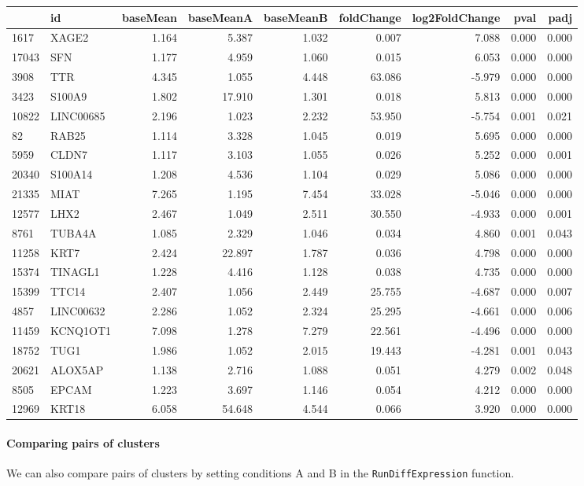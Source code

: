 \documentclass[]{article}
\let\oldparagraph\paragraph
\renewcommand{\paragraph}[1]{\oldparagraph{#1}\mbox{}}
\begin{document}
\begin{longtable}[]{@{}llrrrrrrr@{}}
\toprule
& id & baseMean & baseMeanA & baseMeanB & foldChange & log2FoldChange &
pval & padj\tabularnewline
\midrule
\endhead
1617 & XAGE2 & 1.164 & 5.387 & 1.032 & 0.007 & 7.088 & 0.000 &
0.000\tabularnewline
17043 & SFN & 1.177 & 4.959 & 1.060 & 0.015 & 6.053 & 0.000 &
0.000\tabularnewline
3908 & TTR & 4.345 & 1.055 & 4.448 & 63.086 & -5.979 & 0.000 &
0.000\tabularnewline
3423 & S100A9 & 1.802 & 17.910 & 1.301 & 0.018 & 5.813 & 0.000 &
0.000\tabularnewline
10822 & LINC00685 & 2.196 & 1.023 & 2.232 & 53.950 & -5.754 & 0.001 &
0.021\tabularnewline
82 & RAB25 & 1.114 & 3.328 & 1.045 & 0.019 & 5.695 & 0.000 &
0.000\tabularnewline
5959 & CLDN7 & 1.117 & 3.103 & 1.055 & 0.026 & 5.252 & 0.000 &
0.001\tabularnewline
20340 & S100A14 & 1.208 & 4.536 & 1.104 & 0.029 & 5.086 & 0.000 &
0.000\tabularnewline
21335 & MIAT & 7.265 & 1.195 & 7.454 & 33.028 & -5.046 & 0.000 &
0.000\tabularnewline
12577 & LHX2 & 2.467 & 1.049 & 2.511 & 30.550 & -4.933 & 0.000 &
0.001\tabularnewline
8761 & TUBA4A & 1.085 & 2.329 & 1.046 & 0.034 & 4.860 & 0.001 &
0.043\tabularnewline
11258 & KRT7 & 2.424 & 22.897 & 1.787 & 0.036 & 4.798 & 0.000 &
0.000\tabularnewline
15374 & TINAGL1 & 1.228 & 4.416 & 1.128 & 0.038 & 4.735 & 0.000 &
0.000\tabularnewline
15399 & TTC14 & 2.407 & 1.056 & 2.449 & 25.755 & -4.687 & 0.000 &
0.007\tabularnewline
4857 & LINC00632 & 2.286 & 1.052 & 2.324 & 25.295 & -4.661 & 0.000 &
0.006\tabularnewline
11459 & KCNQ1OT1 & 7.098 & 1.278 & 7.279 & 22.561 & -4.496 & 0.000 &
0.000\tabularnewline
18752 & TUG1 & 1.986 & 1.052 & 2.015 & 19.443 & -4.281 & 0.001 &
0.043\tabularnewline
20621 & ALOX5AP & 1.138 & 2.716 & 1.088 & 0.051 & 4.279 & 0.002 &
0.048\tabularnewline
8505 & EPCAM & 1.223 & 3.697 & 1.146 & 0.054 & 4.212 & 0.000 &
0.000\tabularnewline
12969 & KRT18 & 6.058 & 54.648 & 4.544 & 0.066 & 3.920 & 0.000 &
0.000\tabularnewline
\bottomrule
\end{longtable}

\hypertarget{comparing-pairs-of-clusters}{%
\paragraph{Comparing pairs of
clusters}\label{comparing-pairs-of-clusters}}

We can also compare pairs of clusters by setting conditions A and B in
the \texttt{RunDiffExpression} function.
\end{document}
